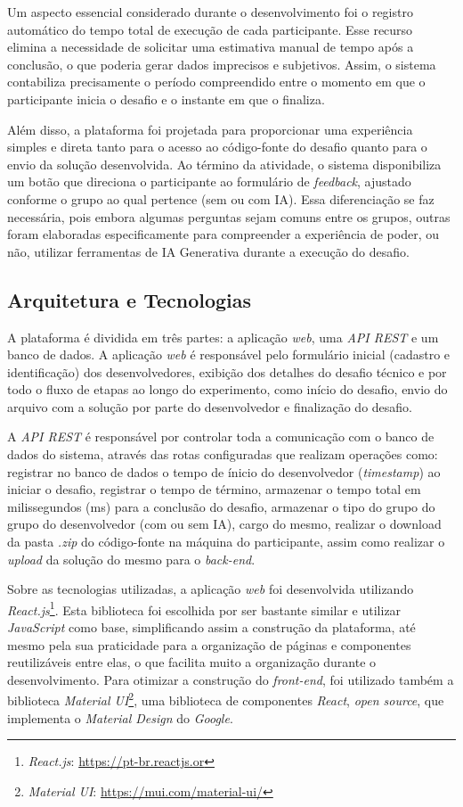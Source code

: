 \documentclass[english,brazilian]{UNISINOSartigo} %
\begin{document}
Um aspecto essencial considerado durante o desenvolvimento foi o registro automático do tempo total de execução de cada participante. Esse recurso elimina a necessidade de solicitar uma estimativa manual de tempo após a conclusão, o que poderia gerar dados imprecisos e subjetivos. Assim, o sistema contabiliza precisamente o período compreendido entre o momento em que o participante inicia o desafio e o instante em que o finaliza.

Além disso, a plataforma foi projetada para proporcionar uma experiência simples e direta tanto para o acesso ao código-fonte do desafio quanto para o envio da solução desenvolvida. Ao término da atividade, o sistema disponibiliza um botão que direciona o participante ao formulário de \textit{feedback}, ajustado conforme o grupo ao qual pertence (sem ou com IA). Essa diferenciação se faz necessária, pois embora algumas perguntas sejam comuns entre os grupos, outras foram elaboradas especificamente para compreender a experiência de poder, ou não, utilizar ferramentas de IA Generativa durante a execução do desafio.

\subsection{Arquitetura e Tecnologias}

A plataforma é dividida em três partes: a aplicação \textit{web}, uma \textit{API REST} e um banco de dados. A aplicação \textit{web} é responsável pelo formulário inicial (cadastro e identificação) dos desenvolvedores, exibição dos detalhes do desafio técnico e por todo o fluxo de etapas ao longo do experimento, como início do desafio, envio do arquivo com a solução por parte do desenvolvedor e finalização do desafio.

A \textit{API REST} é responsável por controlar toda a comunicação com o banco de dados do sistema, através das rotas configuradas que realizam operações como: registrar no banco de dados o tempo de ínicio do desenvolvedor (\textit{timestamp}) ao iniciar o desafio, registrar o tempo de término, armazenar o tempo total em milissegundos (ms) para a conclusão do desafio, armazenar o tipo do grupo do grupo do desenvolvedor (com ou sem IA), cargo do mesmo, realizar o download da pasta \textit{.zip} do código-fonte na máquina do participante, assim como realizar o \textit{upload} da solução do mesmo para o \textit{back-end}.

Sobre as tecnologias utilizadas, a aplicação \textit{web} foi desenvolvida utilizando \textit{React.js}\footnote{\textit{React.js}: \url{https://pt-br.reactjs.or}}. Esta biblioteca foi escolhida por ser bastante similar e utilizar \textit{JavaScript} como base, simplificando assim a construção da plataforma, até mesmo pela sua praticidade para a organização de páginas e componentes reutilizáveis entre elas, o que facilita muito a organização durante o desenvolvimento. Para otimizar a construção do \textit{front-end}, foi utilizado também a biblioteca \textit{Material UI}\footnote{\textit{Material UI}: \url{https://mui.com/material-ui/}}, uma biblioteca de componentes \textit{React}, \textit{open source}, que implementa o \textit{Material Design} do \textit{Google}.
\end{document}
